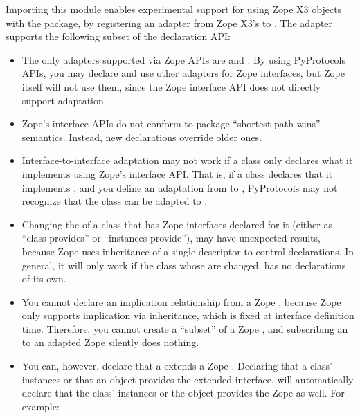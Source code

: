 \begin{verbatim%
}
\begin{verbatim%
}
\begin{verbatim%
}
\begin{verbatim%
}
\begin{verbatim%
}
\begin{verbatim%
}
Importing this module enables experimental support for using Zope X3
 objects with the  package, by registering
an adapter from Zope X3's  to .  The
adapter supports the following subset of the declaration API:

\begin{itemize}

\item The only adapters supported via Zope APIs are 
and .  By using PyProtocols APIs, you may declare and
use other adapters for Zope interfaces, but Zope itself will not use them, since
the Zope interface API does not directly support adaptation.

\item Zope's interface APIs do not conform to  package
``shortest path wins'' semantics.  Instead, new declarations override older
ones.

\item Interface-to-interface adaptation may not work if a class only declares
what it implements using Zope's interface API.  That is, if a class declares
that it implements , and you define an adaptation from
 to , PyProtocols may not
recognize that the class can be adapted to .

\item Changing the  of a class that has Zope interfaces
declared for it (either as ``class provides'' or ``instances provide''), may
have unexpected results, because Zope uses inheritance of a single descriptor
to control declarations.  In general, it will only work if the class whose
 are changed, has no declarations of its own.

\item You cannot declare an implication relationship from a Zope
, because Zope only supports implication via
inheritance, which is fixed at interface definition time.  Therefore, you cannot
create a ``subset'' of a Zope , and subscribing an
 to an adapted Zope 
silently does nothing.

\item You can, however, declare that a  extends a
Zope .  Declaring that a class' instances or that an object
provides the extended interface, will automatically declare that the class'
instances or the object provides the Zope  as well.  For
example:


\end{itemize}
\end{verbatim%
}
\end{verbatim%
}
\end{verbatim%
}
\end{verbatim%
}
\end{verbatim%
}
\end{verbatim%
}
